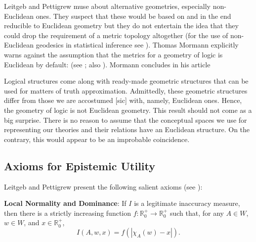 \documentclass[phd,12pt,oneside]{ubcthesis}
\begin{document}
Leitgeb and Pettigrew muse about alternative geometries, especially
non-Euclidean ones. They suspect that these would be based on and in
the end reducible to Euclidean geometry but they do not entertain the
idea that they could drop the requirement of a metric topology
altogether (for the use of non-Euclidean geodesics in statistical
inference see ). Thomas Mormann explicitly warns
against the assumption that the metrics for a geometry of logic is
Euclidean by default:  (see ; also
). Mormann concludes in his article

\begin{quotex}
  Logical structures come along with ready-made geometric structures
  that can be used for matters of truth approximation. Admittedly,
  these geometric structures differ from those we are accostumed [sic]
  with, namely, Euclidean ones. Hence, the geometry of logic is not
  Euclidean geometry. This result should not come as a big surprise.
  There is no reason to assume that the conceptual spaces we use for
  representing our theories and their relations have an Euclidean
  structure. On the contrary, this would appear to be an improbable
  coincidence. 
\end{quotex}

\subsection{Axioms for Epistemic Utility}
\label{subsec:eichaequ}

Leitgeb and Pettigrew present the following salient axioms (see
):

\begin{quotex}
  \textbf{Local Normality and Dominance}: If $I$ is a legitimate
  inaccuracy measure, then there is a strictly increasing function
  $f:\mathbb{R}^{+}_{0}\rightarrow\mathbb{R}^{+}_{0}$ such that, for
  any $A\in{}W$, $w\in{}W$, and $x\in\mathbb{R}^{+}_{0}$,
  \begin{equation}
    \label{eq:e4}
    I(A,w,x)=f\left(|\chi_{A}(w)-x|\right).
  \end{equation}
\end{quotex}
\end{document}
